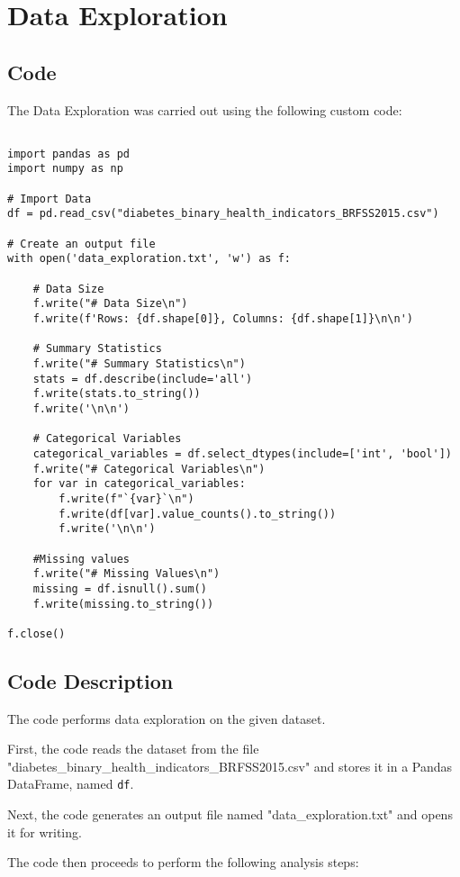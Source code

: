 \documentclass[11pt]{article}
\begin{document}
\section{Data Exploration} \subsection{Code}The Data Exploration was carried out using the following custom code:

\begin{verbatim}

import pandas as pd
import numpy as np

# Import Data
df = pd.read_csv("diabetes_binary_health_indicators_BRFSS2015.csv")

# Create an output file
with open('data_exploration.txt', 'w') as f:
    
    # Data Size
    f.write("# Data Size\n")
    f.write(f'Rows: {df.shape[0]}, Columns: {df.shape[1]}\n\n')

    # Summary Statistics
    f.write("# Summary Statistics\n")
    stats = df.describe(include='all')
    f.write(stats.to_string())
    f.write('\n\n')
    
    # Categorical Variables
    categorical_variables = df.select_dtypes(include=['int', 'bool'])
    f.write("# Categorical Variables\n")
    for var in categorical_variables:
        f.write(f"`{var}`\n")
        f.write(df[var].value_counts().to_string())
        f.write('\n\n')
    
    #Missing values
    f.write("# Missing Values\n")
    missing = df.isnull().sum()
    f.write(missing.to_string())

f.close()

\end{verbatim}

\subsection{Code Description}

The code performs data exploration on the given dataset. 

First, the code reads the dataset from the file "diabetes\_binary\_health\_indicators\_BRFSS2015.csv" and stores it in a Pandas DataFrame, named \texttt{df}.

Next, the code generates an output file named "data\_exploration.txt" and opens it for writing.

The code then proceeds to perform the following analysis steps:
\end{document}
